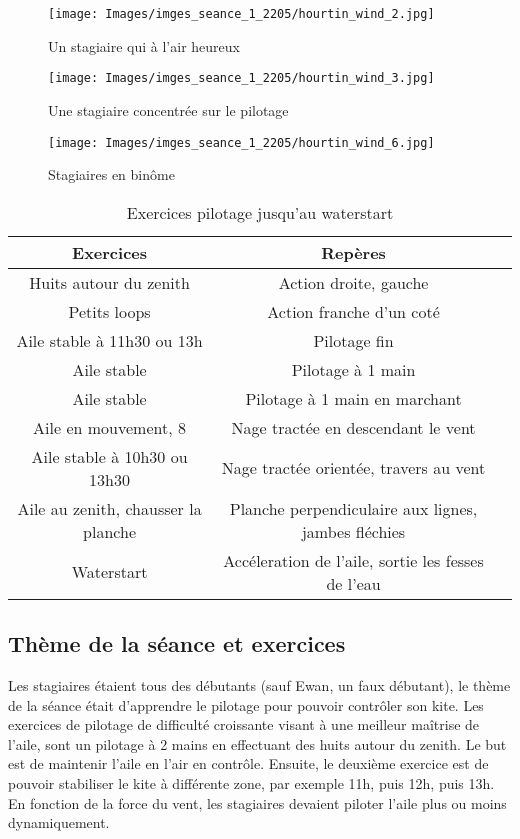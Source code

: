 \documentclass[11pt,a4paper]{report}
\begin{document}
\begin{figure}
\begin{minipage}{0.4\textwidth}
\texttt{[image: Images/imges\_seance\_1\_2205/hourtin\_wind\_2.jpg]} 
\caption{Un stagiaire qui à l'air heureux}
\end{minipage}
\hfill
\begin{minipage}{0.4\textwidth}
\texttt{[image: Images/imges\_seance\_1\_2205/hourtin\_wind\_3.jpg]} 
\caption{Une stagiaire concentrée sur le pilotage}
\end{minipage}
\end{figure}

\begin{figure}
\texttt{[image: Images/imges\_seance\_1\_2205/hourtin\_wind\_6.jpg]}
\caption{Stagiaires en bin\^ome} 
\end{figure}

\begin{table}
\begin{tabular}{|c|c|c|}
\hline
\textbf{Exercices}     &  \textbf{Repères}      \\
\hline 
Huits autour du zenith & Action droite, gauche   \\
\hline
Petits loops  & Action franche d'un coté  \\
\hline 
Aile stable à 11h30 ou 13h & Pilotage fin \\
\hline
Aile stable               & Pilotage à 1 main \\
\hline 
Aile stable               & Pilotage à 1 main en marchant \\
\hline
Aile en mouvement, 8      & Nage tractée en descendant le vent \\
\hline 
Aile stable à 10h30 ou 13h30   	& Nage tractée orientée, travers au vent \\
\hline
Aile au zenith, chausser la planche  & Planche perpendiculaire aux lignes, jambes fléchies \\
\hline
Waterstart                           &  Accéleration de l'aile, sortie les fesses de l'eau \\
\hline
\end{tabular}
\caption{Exercices pilotage jusqu'au waterstart\label{seance_pilotage}}
\end{table}

\subsection{Thème de la séance et exercices}
Les stagiaires étaient tous des débutants (sauf Ewan, un faux débutant), 
le thème de la séance était d'apprendre le pilotage pour pouvoir contrôler son kite.
Les exercices de pilotage de difficulté croissante visant à une
meilleur maîtrise de l'aile, sont un pilotage à 2 mains en effectuant des huits
autour du zenith. Le but est de maintenir l'aile en l'air en contrôle.
Ensuite, le deuxième exercice est de pouvoir stabiliser le kite à différente 
zone, par exemple 11h, puis 12h, puis 13h.
En fonction de la force du vent, les stagiaires
devaient piloter l'aile plus ou moins dynamiquement. 
\end{document}
